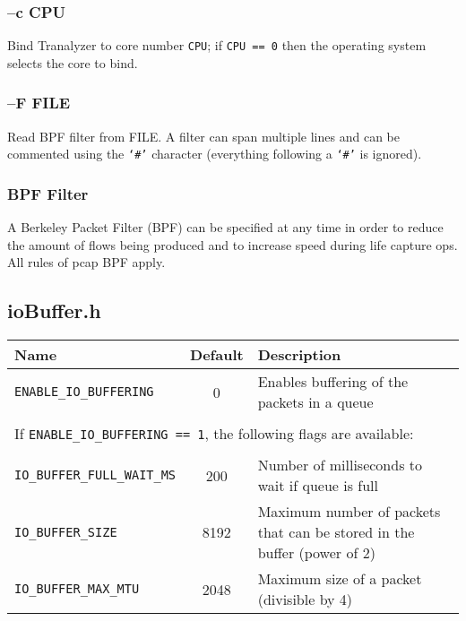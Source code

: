 \subsubsection{--c CPU}
Bind Tranalyzer to core number {\tt CPU}; if {\tt CPU == 0} then the operating system selects the core to bind.

\subsubsection{--F FILE}
Read BPF filter from FILE. A filter can span multiple lines and can be commented using the {\tt `\#'} character (everything following a {\tt `\#'} is ignored).

\subsubsection{BPF Filter}
A Berkeley Packet Filter (BPF) can be specified at any time in order to reduce the amount of flows being produced and to increase speed during life capture ops. All rules of pcap BPF apply.

\subsection{ioBuffer.h}\label{ioBuffer.h}
\begin{longtable}{lcl}
    \toprule
    {\bf Name} & {\bf Default} & {\bf Description}\\
    \midrule\endhead%
    {\tt ENABLE\_IO\_BUFFERING} & 0 & Enables buffering of the packets in a queue\\\\

    \multicolumn{3}{l}{If {\tt ENABLE\_IO\_BUFFERING == 1}, the following flags are available:}\\\\

    {\tt IO\_BUFFER\_FULL\_WAIT\_MS} & 200 & Number of milliseconds to wait if queue is full\\
    {\tt IO\_BUFFER\_SIZE} & 8192 & Maximum number of packets that can be stored in the buffer (power of 2)\\
    {\tt IO\_BUFFER\_MAX\_MTU} & 2048 & Maximum size of a packet (divisible by 4)\\
    \bottomrule
\end{longtable}

